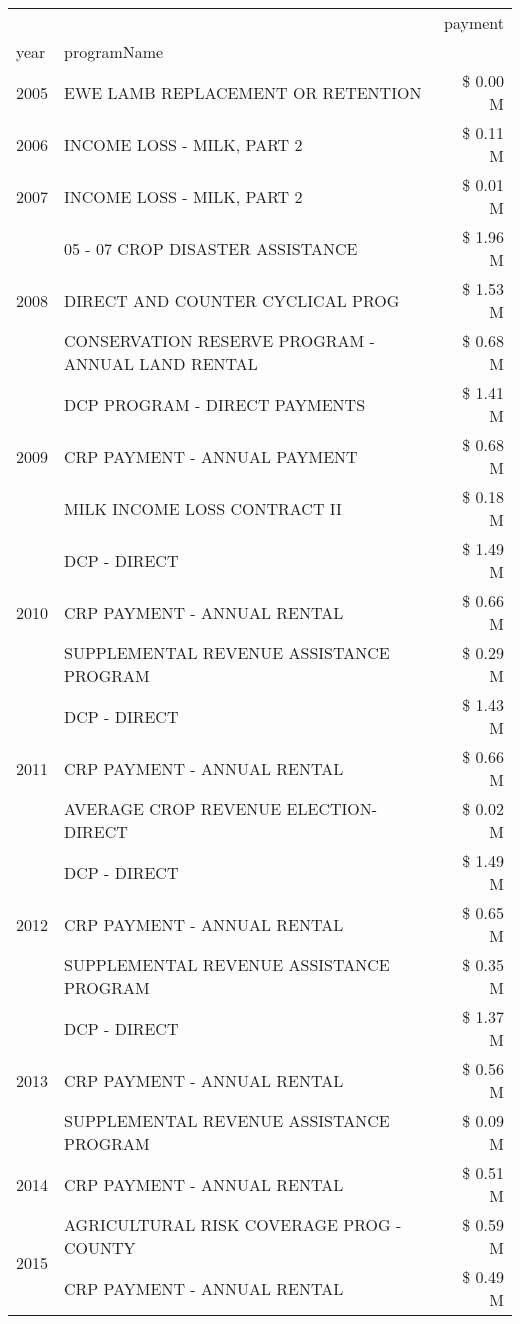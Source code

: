 \begin{tabular}{llr}
\toprule
 &  & payment \\
year & programName &  \\
\midrule
2005 & EWE LAMB REPLACEMENT OR RETENTION & \$ 0.00 M \\
\cline{1-3}
2006 & INCOME LOSS - MILK, PART 2 & \$ 0.11 M \\
\cline{1-3}
2007 & INCOME LOSS - MILK, PART 2 & \$ 0.01 M \\
\cline{1-3}
\multirow[t]{3}{*}{2008} & 05 - 07 CROP DISASTER ASSISTANCE & \$ 1.96 M \\
 & DIRECT AND COUNTER CYCLICAL PROG & \$ 1.53 M \\
 & CONSERVATION RESERVE PROGRAM - ANNUAL LAND RENTAL & \$ 0.68 M \\
\cline{1-3}
\multirow[t]{3}{*}{2009} & DCP PROGRAM - DIRECT PAYMENTS & \$ 1.41 M \\
 & CRP PAYMENT - ANNUAL PAYMENT & \$ 0.68 M \\
 & MILK INCOME LOSS CONTRACT II & \$ 0.18 M \\
\cline{1-3}
\multirow[t]{3}{*}{2010} & DCP - DIRECT & \$ 1.49 M \\
 & CRP PAYMENT - ANNUAL RENTAL & \$ 0.66 M \\
 & SUPPLEMENTAL REVENUE ASSISTANCE PROGRAM & \$ 0.29 M \\
\cline{1-3}
\multirow[t]{3}{*}{2011} & DCP - DIRECT & \$ 1.43 M \\
 & CRP PAYMENT - ANNUAL RENTAL & \$ 0.66 M \\
 & AVERAGE CROP REVENUE ELECTION-DIRECT & \$ 0.02 M \\
\cline{1-3}
\multirow[t]{3}{*}{2012} & DCP - DIRECT & \$ 1.49 M \\
 & CRP PAYMENT - ANNUAL RENTAL & \$ 0.65 M \\
 & SUPPLEMENTAL REVENUE ASSISTANCE PROGRAM & \$ 0.35 M \\
\cline{1-3}
\multirow[t]{3}{*}{2013} & DCP - DIRECT & \$ 1.37 M \\
 & CRP PAYMENT - ANNUAL RENTAL & \$ 0.56 M \\
 & SUPPLEMENTAL REVENUE ASSISTANCE PROGRAM & \$ 0.09 M \\
\cline{1-3}
2014 & CRP PAYMENT - ANNUAL RENTAL & \$ 0.51 M \\
\cline{1-3}
\multirow[t]{3}{*}{2015} & AGRICULTURAL RISK COVERAGE PROG - COUNTY & \$ 0.59 M \\
 & CRP PAYMENT - ANNUAL RENTAL & \$ 0.49 M \\

\end{tabular}
